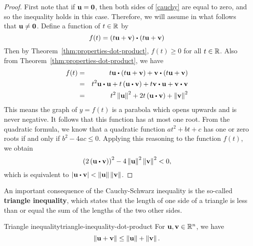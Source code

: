 \begin{proof}
  First note that if $\mbox{\bf u}=\mbox{\bf 0}$, then both sides of
  \eqref{cauchy} are equal to zero, and so the inequality holds in
  this case. Therefore, we will assume in what follows that
  $\mbox{\bf u}\neq \mbox{\bf 0}$.  Define a function of $t\in \mathbb{R}$ by
  \begin{equation*}
    f(t) =\tup{t\vect{u}+\vect{v}} \dotprod \tup{t\vect{u}+
      \vect{v}} 
  \end{equation*}
  Then by Theorem~\ref{thm:properties-dot-product}, $f(t) \geq 0$
  for all $t\in \mathbb{R}$.  Also from
  Theorem~\ref{thm:properties-dot-product}, we have
  \begin{eqnarray*}
    f(t) &=&t\vect{u}\dotprod \tup{t\vect{u}+\vect{v}} +
                 \vect{v}\dotprod \tup{t\vect{u}+\vect{v}} \\
             &=&t^2\vect{u}\dotprod \vect{u}+t\tup{\vect{u}\dotprod \vect{v}} + t \vect{v}\dotprod \vect{u}+
                 \vect{v}\dotprod \vect{v} \\
             &=&t^2\norm{\vect{u}}^{2}+2t\tup{\vect{u}\dotprod \vect{v}} +\norm{
                 \vect{v}} ^{2}
  \end{eqnarray*}
  This means the graph of $y=f(t)$ is a parabola which opens upwards
  and is never negative. It follows that this function has at most one
  root. From the quadratic formula, we know that a quadratic function
  $at^2+bt+c$ has one or zero roots if and only if $b^2-4ac\leq
  0$. Applying this reasoning to the function $f(t)$, we obtain
  \begin{equation*}
    \tup{2\tup{\vect{u}\dotprod \vect{v}} } ^{2}-4\norm{\vect{u}
    } ^{2}\norm{\vect{v}} ^{2}<0,
  \end{equation*}
  which is equivalent to
  $\abs{\vect{u}\dotprod \vect{v} }<\norm{\vect{u}} \norm{\vect{v}}$.
\end{proof}

An important consequence of the Cauchy-Schwarz inequality is the
so-called \textbf{triangle inequality},
which states that the length of one side of a triangle is less than or
equal the sum of the lengths of the two other sides.

\begin{theorem}{Triangle inequality}{triangle-inequality-dot-product}
  For\/ $\mbox{\bf u},\mbox{\bf v}\in \mathbb{R}^{n}$, we have
  \begin{equation}\label{triangle-ineq-1}
    \left\|\mbox{\bf u}+\mbox{\bf v}\right\| \leq \left\|\mbox{\bf u}\right\| +\left\|\mbox{\bf v}\right\|.
  \end{equation}

  \begin{center}
  \end{center}
\end{theorem}

